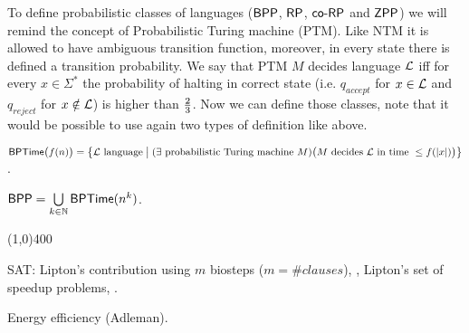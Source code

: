 		To define probabilistic classes of languages ($\mathsf{BPP}$, $\mathsf{RP}$, $\mathsf{co}\textnormal{-}\mathsf{RP}$ and $\mathsf{ZPP}$) we will remind the concept of Probabilistic Turing machine (PTM). Like NTM it is allowed to have ambiguous transition function, moreover, in every state there is defined a transition probability. We say that PTM $M$ decides language $\cal L$ iff for every $x\in\Sigma^*$ the probability of halting in correct state (i.e. $q_{accept}$ for $x\in{\cal L}$ and $q_{reject}$ for $x\notin{\cal L}$) is higher than $\nicefrac{2}{3}$. Now we can define those classes, note that it would be possible to use again two types of definition like above.
		
		
		\begin{defn}\label{def:BPTime}
			$\mathsf{BPTime}\bigl(f(n)\bigr) = \bigl\{ {\cal L}\textnormal{ language} \bigm| (\exists \textnormal{ probabilistic Turing machine }M)\\ \bigl(M\textnormal{ decides }{\cal L}\textnormal{ in time }\leq f(|x|)\bigr) \bigr\}$.
		\end{defn}
		
		\begin{defn}
			$\mathsf{BPP} = \bigcup\limits_{k\in\mathbb{N}} \mathsf{BPTime}(n^k)$.
		\end{defn}
		
		
		
	\begin{center}\line(1,0){400}\end{center}
	
	
	SAT: Lipton's contribution using $m$ biosteps ($m = \#clauses$), \cite{lipton95}, Lipton's set of speedup problems, \cite{lipton96speedup}.
	
	Energy efficiency (Adleman).